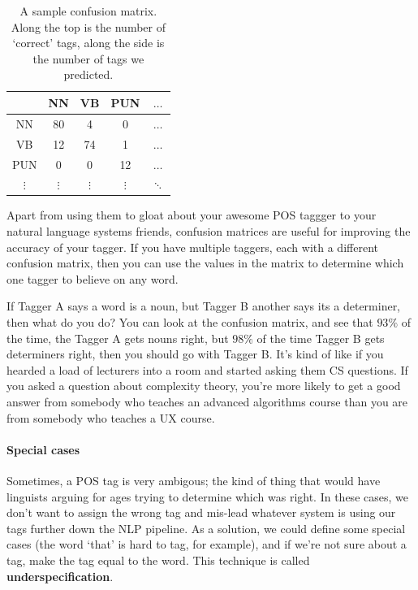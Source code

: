 \begin{table}[h]
  \centering
  \begin{tabular}{|c|c|c|c|c|}
    \hline
        & NN  & VB  & PUN & $\dots$\\ \hline
    NN  & 80  & 4   & 0   & $\dots$\\ \hline
    VB  & 12  & 74  & 1   & $\dots$\\ \hline
    PUN & 0   & 0   & 12  & $\dots$\\ \hline
    $\vdots$ & $\vdots$ & $\vdots$ & $\vdots$ & $\ddots$\\ \hline
  \end{tabular}
  \caption{A sample confusion matrix. Along the top is the number of `correct' 
  tags, along the side is the number of tags we predicted.}
  \label{table:conf-matrix}
\end{table}

Apart from using them to gloat about your awesome POS taggger to your natural
language systems friends, confusion matrices are useful for improving the
accuracy of your tagger. If you have multiple taggers, each with a different
confusion matrix, then you can use the values in the matrix to determine which
one tagger to believe on any word.

If Tagger A says a word is a noun, but Tagger B another says its a determiner,
then what do you do? You can look at the confusion matrix, and see that $93\%$
of the time, the Tagger A gets nouns right, but $98\%$ of the time Tagger B gets
determiners right, then you should go with Tagger B. It's kind of like if you
hearded a load of lecturers into a room and started asking them CS questions. If
you asked a question about complexity theory, you're more likely to get a good
answer from somebody who teaches an advanced algorithms course than you are from
somebody who teaches a UX course.


\paragraph{Special cases} Sometimes, a POS tag is very ambigous; the kind of
thing that would have linguists arguing for ages trying to determine which was
right. In these cases, we don't want to assign the wrong tag and mis-lead
whatever system is using our tags further down the NLP pipeline. As a solution,
we could define some special cases (the word `that' is hard to tag, for
example), and if we're not sure about a tag, make the tag equal to the word.
This technique is called \textbf{underspecification}.
